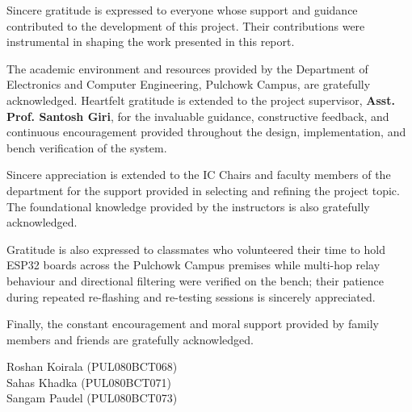 \documentclass[12pt,a4paper]{report}
\begin{document}
Sincere gratitude is expressed to everyone whose support and guidance contributed to the development of this project. Their contributions were instrumental in shaping the work presented in this report.

The academic environment and resources provided by the Department of Electronics and Computer Engineering, Pulchowk Campus, are gratefully acknowledged. Heartfelt gratitude is extended to the project supervisor, \textbf{Asst. Prof. Santosh Giri}, for the invaluable guidance, constructive feedback, and continuous encouragement provided throughout the design, implementation, and bench verification of the system.

Sincere appreciation is extended to the IC Chairs and faculty members of the department for the support provided in selecting and refining the project topic. The foundational knowledge provided by the instructors is also gratefully acknowledged.

Gratitude is also expressed to classmates who volunteered their time to hold ESP32 boards across the Pulchowk Campus premises while multi-hop relay behaviour and directional filtering were verified on the bench; their patience during repeated re-flashing and re-testing sessions is sincerely appreciated.

Finally, the constant encouragement and moral support provided by family members and friends are gratefully acknowledged.

\vspace{1cm}
\noindent Roshan Koirala (PUL080BCT068)\\
Sahas Khadka (PUL080BCT071)\\
Sangam Paudel (PUL080BCT073)

\tableofcontents
\clearpage
\listoffigures
\clearpage
\listoftables
\clearpage
\end{document}
